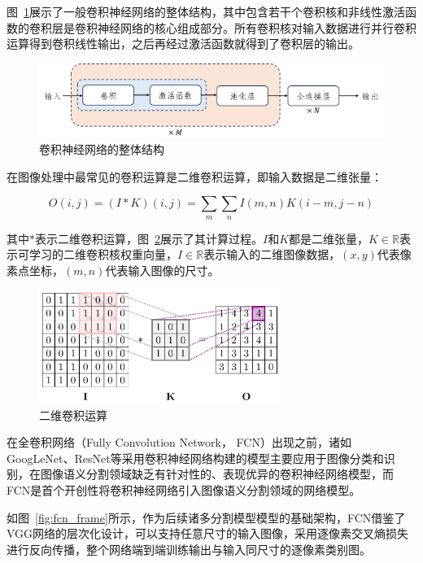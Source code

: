 图~\ref{fig:cnn}展示了一般卷积神经网络的整体结构，其中包含若干个卷积核和非线性激活函数的卷积层是卷积神经网络的核心组成部分。所有卷积核对输入数据进行并行卷积运算得到卷积线性输出，之后再经过激活函数就得到了卷积层的输出\cite{Goodfellow-et-al-2016}。

\begin{figure}[htbp]
    \centering
    \includegraphics[width=\textwidth]{fig/cnn_frame.png}
    \caption{卷积神经网络的整体结构}
    \label{fig:cnn}
\end{figure}

在图像处理中最常见的卷积运算是二维卷积运算，即输入数据是二维张量：

\begin{equation}
    O(i, j)=(I * K)(i, j)=\sum_{m} \sum_{n} I(m, n) K(i-m, j-n)
\end{equation}

其中$*$表示二维卷积运算，图~\ref{fig:2dcnn}展示了其计算过程。$I$和$K$都是二维张量，$ K \in \mathbb{R}$表示可学习的二维卷积核权重向量，$I \in \mathbb{R}$表示输入的二维图像数据，$(x, y)$代表像素点坐标，$(m, n)$代表输入图像的尺寸。

\begin{figure}[!htbp]
    \centering
    \includegraphics[width=0.7\textwidth]{fig/2dcnn-1.png}
    \caption{二维卷积运算}
    \label{fig:2dcnn}
\end{figure}

在全卷积网络（Fully Convolution Network， FCN）出现之前，诸如GoogLeNet、ResNet等\cite{szegedy2014,he2015}采用卷积神经网络构建的模型主要应用于图像分类和识别，在图像语义分割领域缺乏有针对性的、表现优异的卷积神经网络模型，而FCN是首个开创性将卷积神经网络引入图像语义分割领域的网络模型\cite{shelhamer2016}。

如图~\ref{fig:fcn_frame}所示，作为后续诸多分割模型模型的基础架构，FCN借鉴了VGG网络的层次化设计，可以支持任意尺寸的输入图像，采用逐像素交叉熵损失进行反向传播，整个网络端到端训练输出与输入同尺寸的逐像素类别图。


